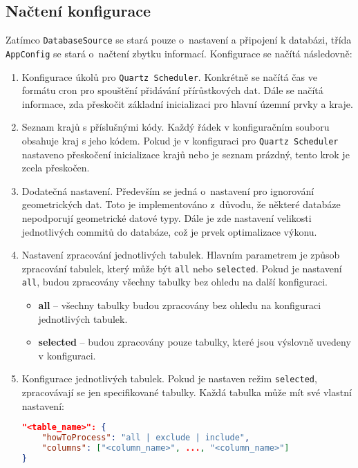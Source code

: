 \subsection{Načtení konfigurace}
\label{sec:konfigurace}
Zatímco \texttt{DatabaseSource} se stará pouze o~nastavení a připojení k databázi,
třída \texttt{AppConfig} se stará o~načtení zbytku informací.
Konfigurace se načítá následovně:
\begin{enumerate}
    \item Konfigurace úkolů pro \texttt{Quartz Scheduler}. 
    Konkrétně se načítá čas ve formátu cron pro spouštění přidávání přírůstkových dat.
    Dále se načítá informace, zda přeskočit základní inicializaci pro hlavní územní prvky a kraje.
    
    \item Seznam krajů s příslušnými kódy. Každý řádek v konfiguračním souboru obsahuje kraj s jeho kódem.
    Pokud je v konfiguraci pro \texttt{Quartz Scheduler} nastaveno přeskočení inicializace krajů nebo je seznam prázdný,
    tento krok je zcela přeskočen.
    
    \item Dodatečná nastavení. Především se jedná o~nastavení pro ignorování geometrických dat.
    Toto je implementováno z~důvodu, že některé databáze nepodporují geometrické datové typy.
    Dále je zde nastavení velikosti jednotlivých commitů do databáze, což je prvek optimalizace výkonu.
    
    \item Nastavení zpracování jednotlivých tabulek. Hlavním parametrem je způsob zpracování tabulek, který může být
    \texttt{all} nebo \texttt{selected}. Pokud je nastavení \texttt{all}, budou zpracovány všechny tabulky bez ohledu na další konfiguraci.
    
    \begin{itemize}
        \item \textbf{all} -- všechny tabulky budou zpracovány bez ohledu na konfiguraci jednotlivých tabulek.
        \item \textbf{selected} -- budou zpracovány pouze tabulky, které jsou výslovně uvedeny v konfiguraci.
    \end{itemize}
    
    \item Konfigurace jednotlivých tabulek. Pokud je nastaven režim \texttt{selected}, zpracovávají se jen specifikované tabulky.
    Každá tabulka může mít své vlastní nastavení:

    \begin{lstlisting}[language=json, caption=Konfigurace tabulek, label=lst:konfTabulek]
"<table_name>": {
    "howToProcess": "all | exclude | include",
    "columns": ["<column_name>", ..., "<column_name>"]
}
    \end{lstlisting}


\end{enumerate}
